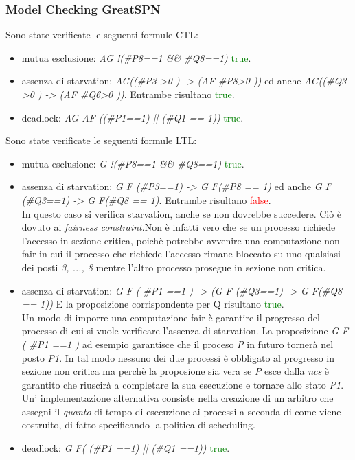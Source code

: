 \documentclass[a4paper]{article}
\begin{document}
\subsubsection{Model Checking GreatSPN}
Sono state verificate le seguenti formule CTL:
\begin{itemize}
	\item mutua esclusione: \textit{AG !(\#P8==1 \&\& \#Q8==1)} \textcolor{green}{true}.\\
	\item assenza di starvation: \textit{AG((\#P3 >0 ) -> (AF \#P8>0 ))} ed anche \textit{AG((\#Q3 >0 ) -> (AF \#Q6>0 ))}. Entrambe risultano \textcolor{green}{true}.\\
	\item deadlock: \textit{AG AF ((\#P1==1) || (\#Q1 == 1))} \textcolor{green}{true}.\\
\end{itemize}
Sono state verificate le seguenti formule LTL:
\begin{itemize}
	\item mutua esclusione: \textit{G !(\#P8==1 \&\& \#Q8==1)} \textcolor{green}{true}.
	\item assenza di starvation: \textit{G F (\#P3==1) -> G F(\#P8 == 1)} ed anche \textit{G F (\#Q3==1) -> G F(\#Q8 == 1)}. Entrambe risultano \textcolor{red}{false}.\\
	In questo caso si verifica starvation, anche se non dovrebbe succedere. Ciò è dovuto ai \textit{fairness constraint}.Non è infatti vero che se un processo richiede l'accesso in sezione critica, poichè potrebbe avvenire una computazione non fair in cui il processo che richiede l'accesso rimane bloccato su uno qualsiasi dei posti \textit{3, ..., 8} mentre l'altro processo prosegue in sezione non critica.
	\item assenza di starvation: \textit{G F ( \#P1 ==1 ) -> (G F (\#Q3==1) -> G F(\#Q8 == 1))} E la proposizione corrispondente per Q risultano \textcolor{green}{true}.\\
Un modo di imporre una computazione fair è garantire il progresso del processo di cui si vuole verificare l'assenza di starvation. La proposizione \textit{G F ( \#P1 ==1 )} ad esempio garantisce che il proceso \textit{P} in futuro tornerà nel posto \textit{P1}. In tal modo nessuno dei due processi è obbligato al progresso in sezione non critica ma perchè la proposione sia vera se \textit{P} esce dalla \textit{ncs} è garantito che riuscirà a completare la sua esecuzione e tornare allo stato \textit{P1}.\\ %
		Un' implementazione alternativa consiste nella creazione di un arbitro che assegni il \textit{quanto} di tempo di esecuzione ai processi a seconda di come viene costruito, di fatto specificando la politica di scheduling.
	\item deadlock: \textit{G F( (\#P1 ==1) ||  (\#Q1 ==1))} \textcolor{green}{true}.
\end{itemize}
\end{document}
